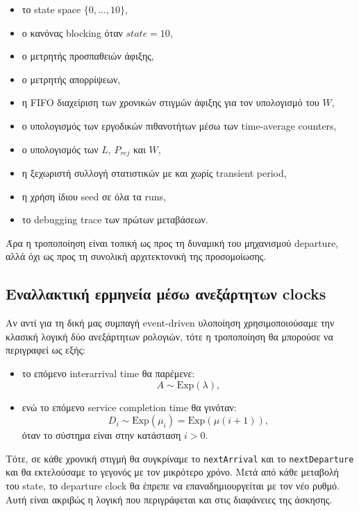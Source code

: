 \documentclass{article}
\begin{document}
\begin{itemize}
    \item το state space $\{0,\ldots,10\}$,
    \item ο κανόνας blocking όταν $state=10$,
    \item ο μετρητής προσπαθειών άφιξης,
    \item ο μετρητής απορρίψεων,
    \item η FIFO διαχείριση των χρονικών στιγμών άφιξης για τον υπολογισμό του $W$,
    \item ο υπολογισμός των εργοδικών πιθανοτήτων μέσω των time-average counters,
    \item ο υπολογισμός των $L$, $P_{rej}$ και $W$,
    \item η ξεχωριστή συλλογή στατιστικών με και χωρίς transient period,
    \item η χρήση ίδιου seed σε όλα τα runs,
    \item το debugging trace των πρώτων μεταβάσεων.
\end{itemize}

Άρα η τροποποίηση είναι τοπική ως προς τη δυναμική του μηχανισμού departure, αλλά όχι ως προς τη συνολική αρχιτεκτονική της προσομοίωσης.

\subsection{Εναλλακτική ερμηνεία μέσω ανεξάρτητων clocks}

Αν αντί για τη δική μας συμπαγή \foreignlanguage{english}{event-driven} υλοποίηση χρησιμοποιούσαμε την κλασική λογική δύο ανεξάρτητων ρολογιών, τότε η τροποποίηση θα μπορούσε να περιγραφεί ως εξής:

\begin{itemize}
    \item το επόμενο interarrival time θα παρέμενε:
    \[
    A \sim \mathrm{Exp}(\lambda),
    \]
    \item ενώ το επόμενο service completion time θα γινόταν:
    \[
    D_i \sim \mathrm{Exp}(\mu_i)=\mathrm{Exp}(\mu(i+1)),
    \]
    όταν το σύστημα είναι στην κατάσταση $i>0$.
\end{itemize}

Τότε, σε κάθε χρονική στιγμή θα συγκρίναμε το \texttt{nextArrival} και το \texttt{nextDeparture} και θα εκτελούσαμε το γεγονός με τον μικρότερο χρόνο. Μετά από κάθε μεταβολή του state, το departure clock θα έπρεπε να επαναδημιουργείται με τον νέο ρυθμό. Αυτή είναι ακριβώς η λογική που περιγράφεται και στις διαφάνειες της άσκησης.
\end{document}
